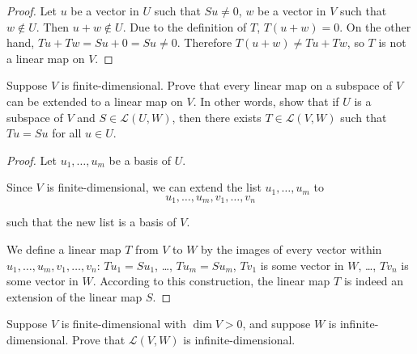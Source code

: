\begin{proof}
    Let $u$ be a vector in $U$ such that $Su\ne 0$, $w$ be a vector in $V$ such that $w\notin U$. Then $u + w\notin U$. Due to the definition of $T$, $T(u + w) = 0$. On the other hand, $Tu + Tw = Su + 0 = Su\ne 0$. Therefore $T(u + w)\ne Tu + Tw$, so $T$ is not a linear map on $V$.
\end{proof}
\newpage


\begin{exercise}\label{chapter3:sectionA:exercise13}
    Suppose $V$ is finite-dimensional. Prove that every linear map on a subspace of $V$ can be extended to a linear map on $V$. In other words, show that if $U$ is a subspace of $V$ and $S \in \mathcal{L}(U, W)$, then there exists $T\in \mathcal{L}(V, W)$ such that $Tu = Su$ for all $u\in U$.
\end{exercise}

\begin{proof}
    Let $u_{1}, \ldots, u_{m}$ be a basis of $U$.

    Since $V$ is finite-dimensional, we can extend the list $u_{1}, \ldots, u_{m}$ to
    \[
        u_{1}, \ldots, u_{m}, v_{1}, \ldots, v_{n}
    \]

    such that the new list is a basis of $V$.

    We define a linear map $T$ from $V$ to $W$ by the images of every vector within $u_{1}, \ldots, u_{m}, v_{1}, \ldots, v_{n}$: $Tu_{1} = Su_{1}$, \ldots, $Tu_{m} = Su_{m}$, $Tv_{1}$ is some vector in $W$, \ldots, $Tv_{n}$ is some vector in $W$. According to this construction, the linear map $T$ is indeed an extension of the linear map $S$.
\end{proof}
\newpage

\begin{exercise}
    Suppose $V$ is finite-dimensional with $\dim V > 0$, and suppose $W$ is infinite-dimensional. Prove that $\mathcal{L}(V, W)$ is infinite-dimensional.
\end{exercise}

